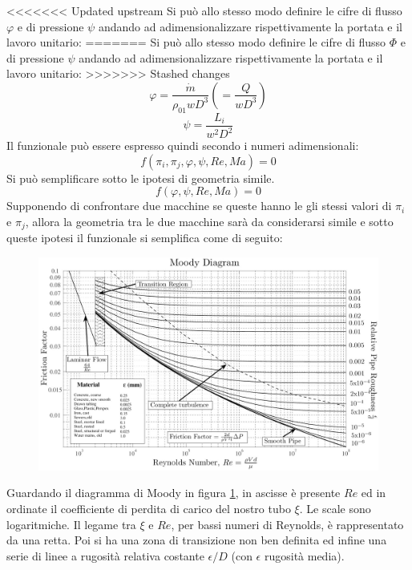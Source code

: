 <<<<<<< Updated upstream
Si può allo stesso modo definire le cifre di flusso $\varphi$ e di pressione $\psi$ andando ad adimensionalizzare rispettivamente la portata e il lavoro unitario:
=======
Si può allo stesso modo definire le cifre di flusso $\Phi$ e di pressione $\psi$ andando ad adimensionalizzare rispettivamente la portata e il lavoro unitario:
>>>>>>> Stashed changes
\begin{equation}
\varphi = \frac{\dot{m}}{\rho_{01}w D^3} \left( =\frac{Q}{w D^3} \right)
\end{equation}
\begin{equation}
\psi = \frac{L_i}{w^2 D^2}
\end{equation}
Il funzionale può essere espresso quindi secondo i numeri adimensionali:
\begin{equation}
f(\pi_i,\pi_j,\varphi,\psi,Re,Ma)=0
\end{equation}
Si può semplificare sotto le ipotesi di geometria simile.
\begin{equation}
f(\varphi,\psi,Re,Ma)=0
\end{equation}
Supponendo di confrontare due macchine se queste hanno le gli stessi valori di $\pi_i$ e $\pi_j$, allora la geometria tra le due macchine sarà da considerarsi simile e sotto queste ipotesi il funzionale si semplifica come di seguito:
\begin{figure}
\centering
  \includegraphics[width=\textwidth]{fig/moody.jpg}
\caption{}
\label{fig:moody}
\end{figure}
Guardando il diagramma di Moody in figura \ref{fig:moody}, in ascisse è presente $Re$ ed in ordinate il coefficiente di perdita di carico del nostro tubo $\xi$. Le scale sono logaritmiche. Il legame tra $\xi$ e $Re$, per bassi numeri di Reynolds, è rappresentato da una retta. Poi si ha una zona di transizione non ben definita ed infine una serie di linee a rugosità relativa costante $\epsilon/D$ (con $\epsilon$ rugosità media).

